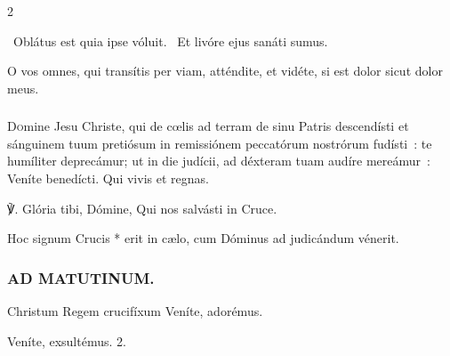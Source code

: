 \documentclass[9pt,twoside]{extarticle}
\begin{document}
\begin{multicols}{2}
{{\begin{tightlist}{}
\item {}~Oblátus est quia ipse vóluit. ~Et livóre ejus sanáti sumus.
\item {} O vos omnes, qui transítis per viam, atténdite, et vidéte, si est dolor sicut dolor meus.
\end{tightlist}

\subsubsection*{\center {}}
\lettrine{D}omine Jesu Christe, qui de cœlis ad terram de sinu Patris descendísti et sánguinem tuum pretiósum in remissiónem peccatórum nostrórum fudísti~: te humíliter deprecámur; ut in die judícii, ad déxteram tuam audíre mereámur~: Veníte benedícti. Qui vivis et regnas.

\begin{tightlist}{}
\item {} ℣. Glória tibi, Dómine, Qui nos salvásti in Cruce.
\item {}
\item {} Hoc signum Crucis * erit in cælo, cum Dóminus ad judicándum vénerit.
\end{tightlist}

\subsubsection*{\center \textsc{AD MATUTINUM.}}
\begin{tightlist}{}
\item {} Christum Regem crucifíxum \textred{*} Veníte, adorémus.
\item {} Veníte, exsultémus. 2.
\end{tightlist}
}}
\end{multicols}
\end{document}
